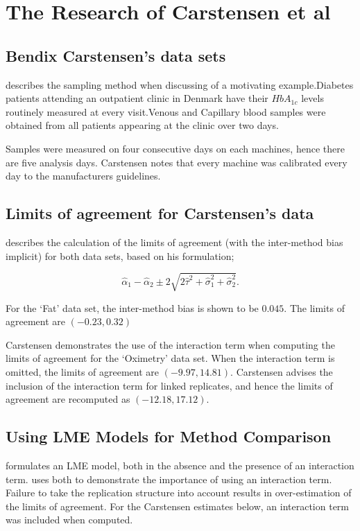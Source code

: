 \documentclass{report}
\begin{document}
	\newpage
	\section{The Research of Carstensen et al}
	\subsection{Bendix Carstensen's data sets}
	\citet{BXC2008}describes the sampling method when discussing of a motivating example.Diabetes patients attending an outpatient clinic in Denmark have their $HbA_{1c}$ levels routinely measured at every visit.Venous and Capillary blood samples were obtained from all patients appearing at the clinic over two days.
	
	Samples were measured on four consecutive days on each machines, hence there are five analysis days. Carstensen notes that every machine was calibrated every day to  the manufacturers guidelines.
	
	
	\subsection{Limits of agreement for Carstensen's data}
	
	
	\citet{BXC2008} describes the calculation of the limits of agreement (with the inter-method bias implicit) for both data sets, based on his formulation;
	
	\[\hat{\alpha}_1 - \hat{\alpha}_2 \pm 2\sqrt{2\hat{\tau}^2 +\hat{\sigma}_1^2 +\hat{\sigma}_2^2 }.\]
	
	For the `Fat' data set, the inter-method bias is shown to be $0.045$. The limits of agreement are $(-0.23 , 0.32)$
	
	Carstensen demonstrates the use of the interaction term when computing the limits of agreement for the `Oximetry' data set. When the interaction term is omitted, the limits of agreement are $(-9.97, 14.81)$. Carstensen advises the inclusion of the interaction term for linked replicates, and hence the limits of agreement are recomputed as $(-12.18,17.12)$.
	
	\subsection{Using LME Models for Method Comparison}
	\citet{bxc2008} formulates an LME model, both in the absence and the presence of an interaction term.\citet{bxc} uses both to demonstrate the importance of using an interaction term. Failure to take the replication structure into
	account results in over-estimation of the limits of agreement. For the Carstensen estimates below, an interaction term was included when computed.
	
\end{document}
